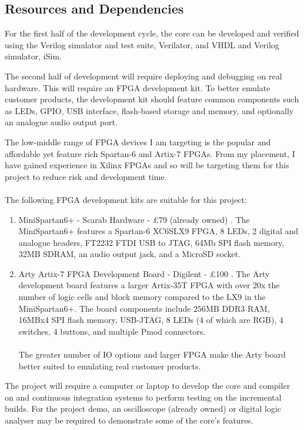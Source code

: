\subsection*{Resources and Dependencies}
For the first half of the development cycle, the core can be developed and verified using the Verilog simulator and test suite, Verilator, and VHDL and Verilog simulator, iSim.

The second half of development will require deploying and debugging on real hardware. This will require an FPGA development kit. To better emulate customer products, the development kit should feature common components such as LEDs, GPIO, USB interface, flash-based storage and memory, and optionally an analogue audio output port.

The low-middle range of FPGA devices I am targeting is the popular and affordable yet feature rich Spartan-6 and Artix-7 FPGAs. From my placement, I have gained experience in Xilinx FPGAs and so will be targeting them for this project to reduce risk and development time.
\\\\
The following FPGA development kits are suitable for this project:
\begin{enumerate}
\item{MiniSpartan6+ - Scarab Hardware - £79 (already owned) \citep{scarabhardware}. The MiniSpartan6+ features a Spartan-6 XC6SLX9 FPGA, 8 LEDs, 2 digital and analogue headers, FT2232 FTDI USB to JTAG, 64Mb SPI flash memory, 32MB SDRAM, an audio output jack, and a MicroSD socket.}

\item{Arty Artix-7 FPGA Development Board - Digilent - £100 \citep{arty}. The Arty development board features a larger Artix-35T FPGA with over 20x the number of logic cells and block memory compared to the LX9 in the MiniSpartan6+. The board components include 256MB DDR3 RAM, 16MBx4 SPI flash memory, USB-JTAG, 8 LEDs (4 of which are RGB), 4 switches, 4 buttons, and multiple Pmod connectors.
\\\\
The greater number of IO options and larger FPGA make the Arty board better suited to emulating real customer products.
}
\end{enumerate}

The project will require a computer or laptop to develop the core and compiler on and continuous integration systems to perform testing on the incremental builds. For the project demo, an oscilloscope (already owned) or digital logic analyser may be required to demonstrate some of the core's features.

